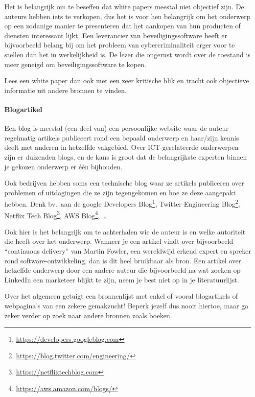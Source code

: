 Het is belangrijk om te beseffen dat white papers meestal niet objectief zijn. De auteurs hebben iets te verkopen, dus het is voor hen belangrijk om het onderwerp op een zodanige manier te presenteren dat het aankopen van hun producten of diensten interessant lijkt. Een leverancier van beveiligingssoftware heeft er bijvoorbeeld belang bij om het probleem van cybercriminaliteit erger voor te stellen dan het in werkelijkheid is. De lezer die ongerust wordt over de toestand is meer geneigd om beveiligingssoftware te kopen.

Lees een white paper dan ook met een zeer kritische blik en tracht ook objectieve informatie uit andere bronnen te vinden.

\paragraph{Blogartikel}

Een blog is meestal (een deel van) een persoonlijke website waar de auteur regelmatig artikels publiceert rond een bepaald onderwerp en haar/zijn kennis deelt met anderen in hetzelfde vakgebied. Over ICT-gerelateerde onderwerpen zijn er duizenden blogs, en de kans is groot dat de belangrijkste experten binnen je gekozen onderwerp er één bijhouden.

Ook bedrijven hebben soms een technische blog waar ze artikels publiceren over problemen of uitdagingen die ze zijn tegengekomen en hoe ze deze aangepakt hebben. Denk bv.\ aan de google Developers Blog\footnote{\url{https://developers.googleblog.com}}, Twitter Engineering Blog\footnote{\url{https://blog.twitter.com/engineering/}}, Netflix Tech Blog\footnote{\url{https://netflixtechblog.com}}, AWS Blog\footnote{\url{https://aws.amazon.com/blogs/}}, \dots

Ook hier is het belangrijk om te achterhalen wie de auteur is en welke autoriteit die heeft over het onderwerp. Wanneer je een artikel vindt over bijvoorbeeld ``continuous delivery'' van Martin Fowler, een wereldwijd erkend expert en spreker rond software-ontwikkeling, dan is dit heel bruikbaar als bron. Een artikel over hetzelfde onderwerp door een andere auteur die bijvoorbeeld na wat zoeken op LinkedIn een marketeer blijkt te zijn, neem je best niet op in je literatuurlijst.

Over het algemeen getuigt een bronnenlijst met enkel of vooral blogartikels of webpagina's van een zekere gemakzucht! Beperk jezelf dus nooit hiertoe, maar ga zeker verder op zoek naar andere bronnen zoals boeken.

